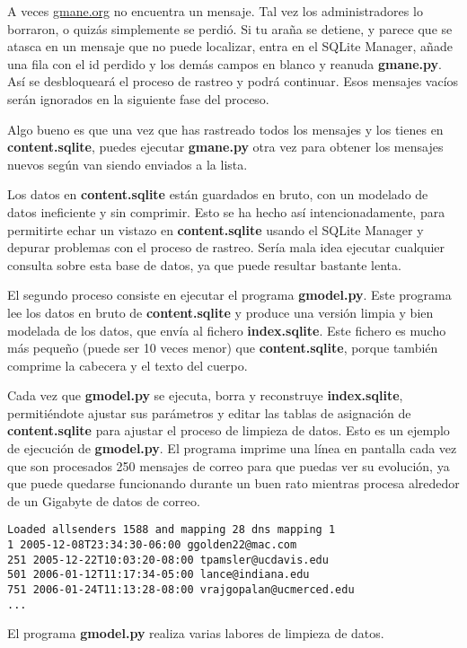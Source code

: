 A veces \url{gmane.org} no encuentra un mensaje. Tal vez los administradores lo borraron,
o quizás simplemente se perdió. Si tu araña se detiene, y parece que se atasca en
un mensaje que no puede localizar, entra en el SQLite Manager, añade una fila con el id perdido y los
demás campos en blanco y reanuda {\bf gmane.py}. Así se desbloqueará el
proceso de rastreo y podrá continuar. Esos mensajes vacíos serán ignorados en la siguiente
fase del proceso.

Algo bueno es que una vez que has rastreado todos los mensajes y los tienes en
{\bf content.sqlite}, puedes ejecutar {\bf gmane.py} otra vez para obtener los mensajes
nuevos según van siendo enviados a la lista.

Los datos en {\bf content.sqlite} están guardados en bruto, con un modelado de datos
ineficiente y sin comprimir.
Esto se ha hecho así intencionadamente, para permitirte echar un vistazo en {\bf content.sqlite}
usando el SQLite Manager y depurar problemas con el proceso de rastreo.
Sería mala idea ejecutar cualquier consulta sobre esta base de datos, ya que
puede resultar bastante lenta.

El segundo proceso consiste en ejecutar el programa {\bf gmodel.py}. Este programa lee los datos
en bruto de {\bf content.sqlite} y produce una versión limpia y bien modelada de los datos,
que envía al fichero {\bf index.sqlite}. Este fichero es mucho más pequeño (puede ser 10 veces
menor) que {\bf content.sqlite}, porque también comprime la cabecera y el texto del cuerpo.

Cada vez que {\bf gmodel.py} se ejecuta, borra y reconstruye {\bf index.sqlite}, permitiéndote
ajustar sus parámetros y editar las tablas de asignación de {\bf content.sqlite} para ajustar el
proceso de limpieza de datos. Esto es un ejemplo de ejecución de {\bf gmodel.py}. El programa imprime
una línea en pantalla cada vez que son procesados 250 mensajes de correo para que puedas ver su
evolución, ya que puede quedarse funcionando durante un buen rato mientras procesa alrededor de
un Gigabyte de datos de correo.

\beforeverb
\begin{verbatim}
Loaded allsenders 1588 and mapping 28 dns mapping 1
1 2005-12-08T23:34:30-06:00 ggolden22@mac.com
251 2005-12-22T10:03:20-08:00 tpamsler@ucdavis.edu
501 2006-01-12T11:17:34-05:00 lance@indiana.edu
751 2006-01-24T11:13:28-08:00 vrajgopalan@ucmerced.edu
...
\end{verbatim}
\afterverb
%
El programa {\bf gmodel.py} realiza varias labores de limpieza de datos.

